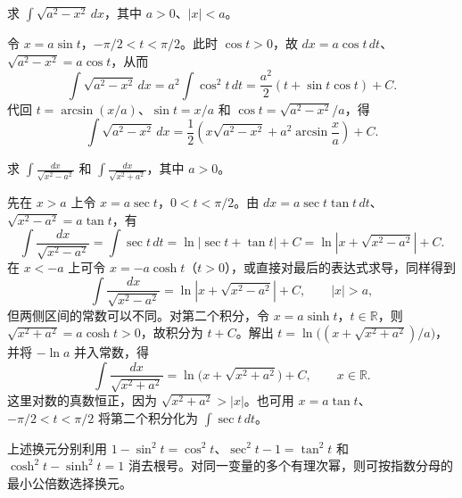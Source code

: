 \documentclass[UTF8,12pt,a4paper,fontset=fandol]{ctexbook}
\begin{document}
\begin{example}
\label{ex:trigonometric-substitution-for-semicircle}
求 $\displaystyle\int\sqrt{a^2-x^2}\,dx$，其中 $a>0$、$|x|<a$。
\end{example}

\begin{solve}
令 $x=a\sin t$，$-\pi/2<t<\pi/2$。此时 $\cos t>0$，故 $dx=a\cos t\,dt$、$\sqrt{a^2-x^2}=a\cos t$，从而
\[
    \int\sqrt{a^2-x^2}\,dx
      =a^2\int\cos^2t\,dt
      =\frac{a^2}{2}(t+\sin t\cos t)+C.
\]
代回 $t=\arcsin(x/a)$、$\sin t=x/a$ 和 $\cos t=\sqrt{a^2-x^2}/a$，得
\begin{equation}
    \int\sqrt{a^2-x^2}\,dx
      =\frac12\left(x\sqrt{a^2-x^2}+a^2\arcsin\frac xa\right)+C.
    \label{eq:semicircle-antiderivative}
\end{equation}
\end{solve}

\begin{example}
\label{ex:logarithmic-integrals-of-quadratic-radicals}
求 $\displaystyle\int\frac{dx}{\sqrt{x^2-a^2}}$ 和 $\displaystyle\int\frac{dx}{\sqrt{x^2+a^2}}$，其中 $a>0$。
\end{example}

\begin{solve}
先在 $x>a$ 上令 $x=a\sec t$，$0<t<\pi/2$。由 $dx=a\sec t\tan t\,dt$、$\sqrt{x^2-a^2}=a\tan t$，有
\[
    \int\frac{dx}{\sqrt{x^2-a^2}}
       =\int\sec t\,dt
       =\ln|\sec t+\tan t|+C
       =\ln|x+\sqrt{x^2-a^2}|+C.
\]
在 $x<-a$ 上可令 $x=-a\cosh t$（$t>0$），或直接对最后的表达式求导，同样得到
\begin{equation}
    \int\frac{dx}{\sqrt{x^2-a^2}}
       =\ln|x+\sqrt{x^2-a^2}|+C,\qquad |x|>a,
    \label{eq:reciprocal-difference-radical-integral}
\end{equation}
但两侧区间的常数可以不同。对第二个积分，令 $x=a\sinh t$，$t\in\mathbb{R}$，则 $\sqrt{x^2+a^2}=a\cosh t>0$，故积分为 $t+C$。解出 $t=\ln\bigl((x+\sqrt{x^2+a^2})/a\bigr)$，并将 $-\ln a$ 并入常数，得
\begin{equation}
    \int\frac{dx}{\sqrt{x^2+a^2}}
       =\ln\bigl(x+\sqrt{x^2+a^2}\bigr)+C,
       \qquad x\in\mathbb{R}.
    \label{eq:reciprocal-sum-radical-integral}
\end{equation}
这里对数的真数恒正，因为 $\sqrt{x^2+a^2}>|x|$。也可用 $x=a\tan t$、$-\pi/2<t<\pi/2$ 将第二个积分化为 $\int\sec t\,dt$。
\end{solve}

上述换元分别利用 $1-\sin^2t=\cos^2t$、$\sec^2t-1=\tan^2t$ 和 $\cosh^2t-\sinh^2t=1$ 消去根号。对同一变量的多个有理次幂，则可按指数分母的最小公倍数选择换元。
\end{document}
